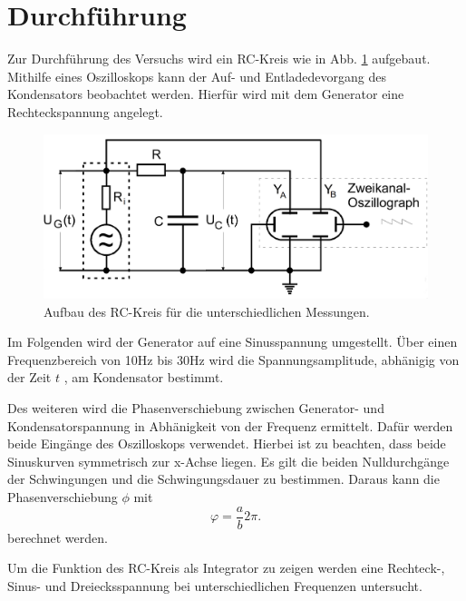 
\section{Durchführung}
Zur Durchführung des Versuchs wird ein RC-Kreis wie in Abb. \ref{fig:aufbau} aufgebaut. Mithilfe
eines Oszilloskops kann der Auf- und Entladedevorgang des Kondensators beobachtet werden.
Hierfür wird mit dem Generator eine Rechteckspannung angelegt.
\begin{figure}
  \centering
  \includegraphics[width = \textwidth]{Aufbau_V353.png}
  \caption{Aufbau des RC-Kreis für die unterschiedlichen Messungen.}
  \label{fig:aufbau}
\end{figure}

Im Folgenden wird der Generator auf eine Sinusspannung umgestellt.
Über einen Frequenzbereich
von 10Hz bis 30Hz wird die Spannungsamplitude, abhänigig von der Zeit $t$
, am Kondensator bestimmt.

Des weiteren wird die Phasenverschiebung zwischen Generator- und Kondensatorspannung
in Abhänigkeit von der Frequenz ermittelt. Dafür werden beide Eingänge des Oszilloskops verwendet.
Hierbei ist zu beachten, dass beide Sinuskurven symmetrisch zur x-Achse liegen. Es gilt die
beiden Nulldurchgänge der Schwingungen und die Schwingungsdauer zu bestimmen. Daraus kann die
Phasenverschiebung $\phi$ mit
\begin{equation}
\varphi = \frac{a}{b} 2 \pi.
\label{eqn:phi}
\end{equation}
berechnet werden.

Um die Funktion des RC-Kreis als Integrator zu zeigen
werden eine Rechteck-,
Sinus- und Dreiecksspannung bei unterschiedlichen Frequenzen untersucht.
